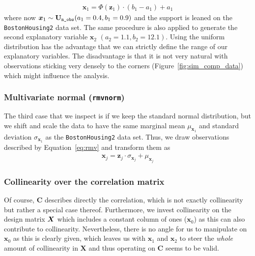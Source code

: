\documentclass[11pt,a4paper,twoside]{book}\usepackage[]{graphicx}\usepackage[]{xcolor}
\begin{document}
\begin{align*}
\boldsymbol{x}_1 = \Phi\left(\boldsymbol{z}_1\right)\cdot (b_1-a_1) + a_1
\end{align*}
where now $\boldsymbol{x}_1\sim {\mathbf{U}}_{\texttt{n\_obs}}(a_1=0.4,b_1 = 0.9)$ and the support is leaned on the \texttt{BostonHousing2} data set. The same procedure is also applied to generate the second explanatory variable $\boldsymbol{x}_2$ $(a_2=1.1,b_2 = 12.1)$. Using the uniform distribution has the advantage that we can strictly define the range of our explanatory variables. The disadvantage is that it is not very natural with observations sticking very densely to the corners (Figure~\ref{fig:sim_comp_data}) which might influence the analysis.

\subsubsection{Multivariate normal (\texttt{rmvnorm})}\label{section:mvt_stay}
The third case that we inspect is if we keep the standard normal distribution, but we shift and scale the data to have the same marginal mean $\mu_{\boldsymbol{x}_1}$ and standard deviation $\sigma_{\boldsymbol{x}_1}$ as the \texttt{BostonHousing2} data set.
Thus, we draw observations described by Equation~\eqref{eq:rmv} and transform them as
\begin{align*}
\boldsymbol{x}_j = \boldsymbol{z}_j\cdot \sigma_{\boldsymbol{x}_j} + \mu_{\boldsymbol{x}_j}
\end{align*}

\subsubsection{Collinearity over the correlation matrix}\label{sec:collovercorr}
Of course, $\boldsymbol{C}$ describes directly the correlation, which is not exactly collinearity but rather a special case thereof. Furthermore, we invest collinearity on the design matrix ${\boldsymbol{X}}$ which includes a constant column of ones ($\boldsymbol{x}_0$) as this can also contribute to collinearity. Nevertheless, there is no angle for us to manipulate on $\boldsymbol{x}_0$ as this is clearly given, which leaves us with $\boldsymbol{x}_1$ and $\boldsymbol{x}_2$ to steer the \textit{whole} amount of collinearity in $\boldsymbol{X}$ and thus operating on $\boldsymbol{C}$ seems to be valid.
\end{document}
